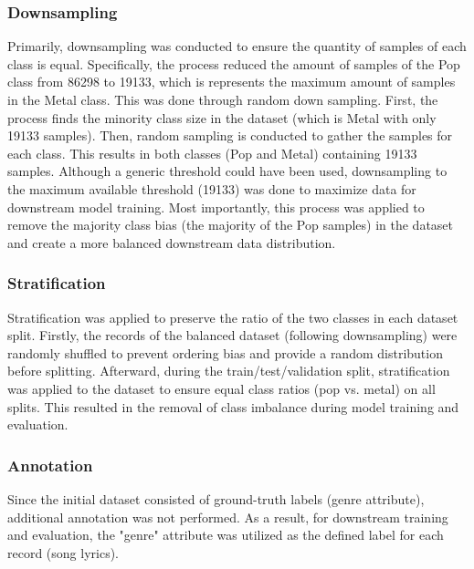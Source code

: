 \subsubsection{Downsampling}
Primarily, downsampling was conducted to ensure the quantity of samples of each class is equal. Specifically, the process reduced the amount of samples of the Pop class from 86298 to 19133, which is represents the maximum amount of samples in the Metal class. This was done through random down sampling. First, the process finds the minority class size in the dataset (which is Metal with only 19133 samples). Then, random sampling is conducted to gather the samples for each class. This results in both classes (Pop and Metal) containing 19133 samples. Although a generic threshold could have been used, downsampling to the maximum available threshold (19133) was done to maximize data for downstream model training. Most importantly, this process was applied to remove the majority class bias (the majority of the Pop samples) in the dataset and create a more balanced downstream data distribution.

\subsubsection{Stratification}
Stratification was applied to preserve the ratio of the two classes in each dataset split. Firstly, the records of the balanced dataset (following downsampling) were randomly shuffled to prevent ordering bias and provide a random distribution before splitting. Afterward, during the train/test/validation split, stratification was applied to the dataset to ensure equal class ratios (pop vs. metal) on all splits. This resulted in the removal of class imbalance during model training and evaluation.

\subsubsection{Annotation}
Since the initial dataset consisted of ground-truth labels (genre attribute), additional annotation was not performed. As a result, for downstream training and evaluation, the "genre" attribute was utilized as the defined label for each record (song lyrics). 

